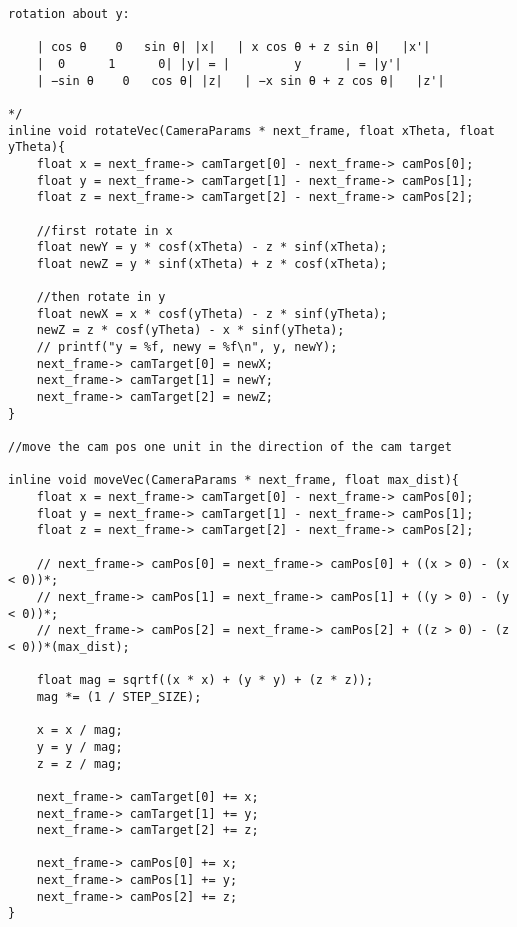 \documentclass[]{article}
\begin{document}
\begin{Verbatim}[fontsize= \footnotesize, tabsize=4]
rotation about y:

	| cos θ    0   sin θ| |x|   | x cos θ + z sin θ|   |x'|
    |  0      1      0| |y| = |         y      | = |y'|
    | −sin θ    0   cos θ| |z|   | −x sin θ + z cos θ|   |z'|

*/
inline void rotateVec(CameraParams * next_frame, float xTheta, float yTheta){
	float x = next_frame-> camTarget[0] - next_frame-> camPos[0];
	float y = next_frame-> camTarget[1] - next_frame-> camPos[1];
	float z = next_frame-> camTarget[2] - next_frame-> camPos[2];

	//first rotate in x
	float newY = y * cosf(xTheta) - z * sinf(xTheta);
	float newZ = y * sinf(xTheta) + z * cosf(xTheta);

	//then rotate in y
	float newX = x * cosf(yTheta) - z * sinf(yTheta);
	newZ = z * cosf(yTheta) - x * sinf(yTheta);
	// printf("y = %f, newy = %f\n", y, newY);
	next_frame-> camTarget[0] = newX;
	next_frame-> camTarget[1] = newY;
	next_frame-> camTarget[2] = newZ;
}

//move the cam pos one unit in the direction of the cam target

inline void moveVec(CameraParams * next_frame, float max_dist){
	float x = next_frame-> camTarget[0] - next_frame-> camPos[0];
	float y = next_frame-> camTarget[1] - next_frame-> camPos[1];
	float z = next_frame-> camTarget[2] - next_frame-> camPos[2];

	// next_frame-> camPos[0] = next_frame-> camPos[0] + ((x > 0) - (x < 0))*;
	// next_frame-> camPos[1] = next_frame-> camPos[1] + ((y > 0) - (y < 0))*;
	// next_frame-> camPos[2] = next_frame-> camPos[2] + ((z > 0) - (z < 0))*(max_dist);

	float mag = sqrtf((x * x) + (y * y) + (z * z));
	mag *= (1 / STEP_SIZE);

	x = x / mag;
	y = y / mag;
	z = z / mag;

	next_frame-> camTarget[0] += x;
	next_frame-> camTarget[1] += y;
	next_frame-> camTarget[2] += z;

	next_frame-> camPos[0] += x;
	next_frame-> camPos[1] += y;
	next_frame-> camPos[2] += z;
}
\end{Verbatim}
\end{document}
